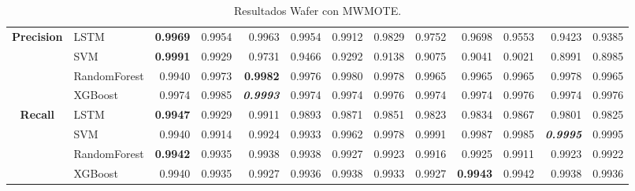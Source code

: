 \begin{table}[H]
\begin{adjustbox}{max width=14cm}
\begin{tabular}{|c|l|r|r|r|r|r|r|r|r|r|r|r|}
			\hline
			\textbf{Precision} &  LSTM & \textbf{  0.9969 } &  0.9954 &  0.9963 &  0.9954 &  0.9912 &  0.9829 &  0.9752 &  0.9698 &  0.9553 &  0.9423 &  0.9385 \\
			&  SVM & \textbf{  0.9991 } &  0.9929 &  0.9731 &  0.9466 &  0.9292 &  0.9138 &  0.9075 &  0.9041 &  0.9021 &  0.8991 &  0.8985 \\
			&  RandomForest &  0.9940 &  0.9973 & \textbf{  0.9982 } &  0.9976 &  0.9980 &  0.9978 &  0.9965 &  0.9965 &  0.9965 &  0.9978 &  0.9965 \\
			&  XGBoost &  0.9974 &  0.9985 & \textit{ \textbf{  0.9993 } } &  0.9974 &  0.9974 &  0.9976 &  0.9974 &  0.9974 &  0.9976 &  0.9974 &  0.9976 \\
			\hline
			\textbf{Recall} &  LSTM & \textbf{  0.9947 } &  0.9929 &  0.9911 &  0.9893 &  0.9871 &  0.9851 &  0.9823 &  0.9834 &  0.9867 &  0.9801 &  0.9825 \\
			&  SVM &  0.9940 &  0.9914 &  0.9924 &  0.9933 &  0.9962 &  0.9978 &  0.9991 &  0.9987 &  0.9985 & \textit{ \textbf{  0.9995 } } &  0.9995 \\
			&  RandomForest & \textbf{  0.9942 } &  0.9935 &  0.9938 &  0.9938 &  0.9927 &  0.9923 &  0.9916 &  0.9925 &  0.9911 &  0.9923 &  0.9922 \\
			&  XGBoost &  0.9940 &  0.9935 &  0.9927 &  0.9936 &  0.9938 &  0.9933 &  0.9927 & \textbf{  0.9943 } &  0.9942 &  0.9938 &  0.9936 \\
			\hline
		\end{tabular}
	\end{adjustbox}
	\caption{Resultados Wafer con MWMOTE.}
	\label{tab:Wafer_MWMOTE}
\end{table}

